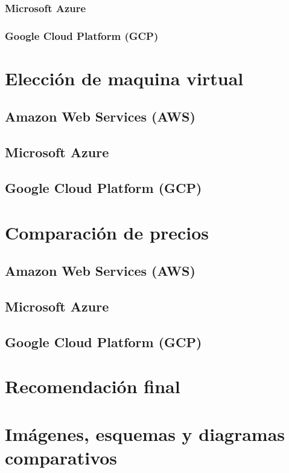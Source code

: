 \documentclass{article}
\begin{document}
  \subsubsection*{Microsoft Azure}
  \subsubsection*{Google Cloud Platform (GCP)}

\section{Elección de maquina virtual}
  \subsection{Amazon Web Services (AWS)}
  \subsection{Microsoft Azure}
  \subsection{Google Cloud Platform (GCP)}

\section{Comparación de precios}
  \subsection{Amazon Web Services (AWS)}
  \subsection{Microsoft Azure}
  \subsection{Google Cloud Platform (GCP)}

\section{Recomendación final}

\section{Imágenes, esquemas y diagramas comparativos}


\printbibliography
\end{document}
